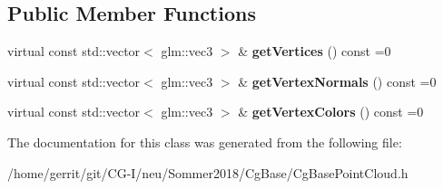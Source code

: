\subsection*{Public Member Functions}
\begin{DoxyCompactItemize}
\item 
\mbox{\label{class_cg_base_point_cloud_ab8fcc89bb4bb33ef9a2b03277f48dc94}} 
virtual const std\+::vector$<$ glm\+::vec3 $>$ \& {\bfseries get\+Vertices} () const =0
\item 
\mbox{\label{class_cg_base_point_cloud_a51392b2fed4d3eb5d68d2832d495ea4b}} 
virtual const std\+::vector$<$ glm\+::vec3 $>$ \& {\bfseries get\+Vertex\+Normals} () const =0
\item 
\mbox{\label{class_cg_base_point_cloud_af9d7e44d0f97fa8d9db53cf09dd275f0}} 
virtual const std\+::vector$<$ glm\+::vec3 $>$ \& {\bfseries get\+Vertex\+Colors} () const =0
\end{DoxyCompactItemize}


The documentation for this class was generated from the following file\+:\begin{DoxyCompactItemize}
\item 
/home/gerrit/git/\+C\+G-\/\+I/neu/\+Sommer2018/\+Cg\+Base/Cg\+Base\+Point\+Cloud.\+h\end{DoxyCompactItemize}
